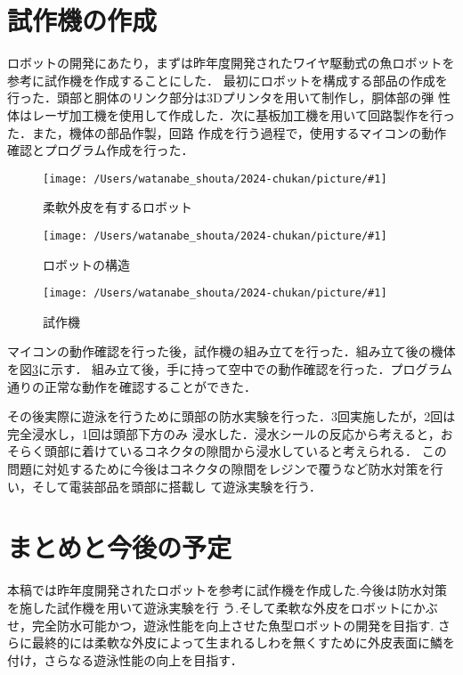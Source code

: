 \documentclass{jarticle}
\newcommand{\setPicture}[1]{\texttt{[image: /Users/watanabe\_shouta/2024-chukan/picture/\#1]}}
\begin{document}
\section{試作機の作成}
ロボットの開発にあたり，まずは昨年度開発されたワイヤ駆動式の魚ロボットを参考に試作機を作成することにした．
最初にロボットを構成する部品の作成を行った．頭部と胴体のリンク部分は3Dプリンタを用いて制作し，胴体部の弾
性体はレーザ加工機を使用して作成した．次に基板加工機を用いて回路製作を行った．また，機体の部品作製，回路
作成を行う過程で，使用するマイコンの動作確認とプログラム作成を行った．

\begin{figure}[H]
   \centering
   \setPicture{fish-torso.jpg}
   \vspace*{-4mm}
   \caption{柔軟外皮を有するロボット}
   \label{fig:bandable-Torso}
\end{figure}
\vspace{-4mm}
\begin{figure}[H]
   \centering
   \setPicture{tentativeschematic.png}
   \vspace*{-4mm}
   \caption{ロボットの構造}
   \label{fig:structure}
\end{figure}
\vspace{-4mm}
\begin{figure}[H]
   \centering
   \setPicture{fish-copy.jpg}
   \vspace*{-4mm}
   \caption{試作機}
   \label{fig:fish-type}
\end{figure}

\vspace{-4mm}

マイコンの動作確認を行った後，試作機の組み立てを行った．組み立て後の機体を図\ref{fig:fish-type}に示す．
組み立て後，手に持って空中での動作確認を行った．プログラム通りの正常な動作を確認することができた．


その後実際に遊泳を行うために頭部の防水実験を行った．3回実施したが，2回は完全浸水し，1回は頭部下方のみ
浸水した．浸水シールの反応から考えると，おそらく頭部に着けているコネクタの隙間から浸水していると考えられる．
この問題に対処するために今後はコネクタの隙間をレジンで覆うなど防水対策を行い，そして電装部品を頭部に搭載し
て遊泳実験を行う．

\vspace*{-2mm}
\section{まとめと今後の予定}
本稿では昨年度開発されたロボットを参考に試作機を作成した.今後は防水対策を施した試作機を用いて遊泳実験を行
う.そして柔軟な外皮をロボットにかぶせ，完全防水可能かつ，遊泳性能を向上させた魚型ロボットの開発を目指す.
さらに最終的には柔軟な外皮によって生まれるしわを無くすために外皮表面に鱗を付け，さらなる遊泳性能の向上を目指す．
\end{document}
